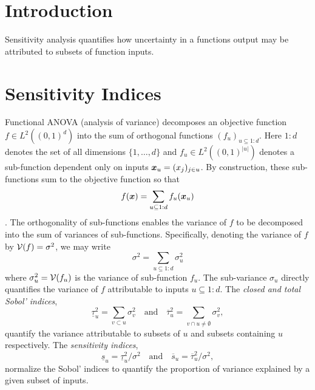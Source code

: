 \documentclass{article}[12pt]
\begin{document}
\section{Introduction}


Sensitivity analysis quantifies how uncertainty in a functions output may be attributed to subsets of function inputs. 

\section{Sensitivity Indices}

Functional ANOVA (analysis of variance) decomposes an objective function $f \in L^2((0,1)^d)$ into the sum of orthogonal functions $(f_u)_{u \subseteq 1:d}$. Here $1:d$ denotes the set of all dimensions $\{1,\dots,d\}$ and $f_u \in L^2((0,1)^{\lvert u \rvert})$ denotes a sub-function dependent only on inputs $\boldsymbol{x}_u = (x_j)_{j \in u}$. By construction, these sub-functions sum to the objective function so that
\begin{equation*}
    f(\boldsymbol{x}) = \sum_{u \subseteq 1:d} f_u(\boldsymbol{x}_u)
\end{equation*}
\cite[Appendix A]{mcbook}. The orthogonality of sub-functions enables the variance of $f$ to be decomposed into the sum of variances of sub-functions. Specifically, denoting the variance of $f$ by $\mathcal{V}(f)=\sigma^2$, we may write
\begin{equation*}
    \sigma^2 = \sum_{u \subseteq 1:d} \sigma^2_u
\end{equation*}
where $\sigma^2_u = \mathcal{V}(f_u)$ is the variance of sub-function $f_u$. The sub-variance $\sigma_u$ directly quantifies the variance of $f$ attributable to inputs $u \subseteq 1:d$.  The \emph{closed and total Sobol' indices},
\begin{equation}
    \label{eq:sobol_indices}
    \underline{\tau}_u^2 = \sum_{v \subset u} \sigma^2_v \quad \text{and} \quad 
    \overline{\tau}_u^2 = \sum_{v \cap u \neq \emptyset} \sigma^2_v,
\end{equation}
quantify the variance attributable to subsets of $u$ and subsets containing $u$ respectively. The \emph{sensitivity indices},
\begin{equation}
    \label{eq:sensitivity_indices_og}
    \underline{s}_u = \underline{\tau}_u^2/\sigma^2 \quad \text{and} \quad 
    \overline{s}_u = \overline{\tau}_u^2/\sigma^2,
\end{equation}
normalize the Sobol' indices to quantify the proportion of variance explained by a given subset of inputs. 
\end{document}
